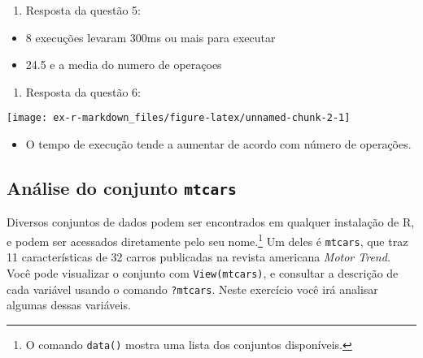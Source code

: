 \documentclass[
]{article}
\newenvironment{Shaded}{\begin{snugshade}}{\end{snugshade}}
\newcommand{\FunctionTok}[1]{\textcolor[rgb]{0.00,0.00,0.00}{#1}}
\newcommand{\NormalTok}[1]{#1}
\newcommand{\SpecialCharTok}[1]{\textcolor[rgb]{0.00,0.00,0.00}{#1}}
\providecommand{\tightlist}{%
  \setlength{\itemsep}{0pt}\setlength{\parskip}{0pt}}
\begin{document}
\begin{enumerate}
\def\labelenumi{\arabic{enumi}.}
\setcounter{enumi}{4}
\tightlist
\item
  Resposta da questão 5:
\end{enumerate}

\begin{itemize}
\tightlist
\item
  8 execuções levaram 300ms ou mais para executar
\item
  24.5 e a media do numero de operaçoes
\end{itemize}

\begin{enumerate}
\def\labelenumi{\arabic{enumi}.}
\setcounter{enumi}{5}
\tightlist
\item
  Resposta da questão 6:
\end{enumerate}

\begin{Shaded}
\end{Shaded}

\begin{center}\texttt{[image: ex-r-markdown\_files/figure-latex/unnamed-chunk-2-1]} \end{center}

\begin{itemize}
\tightlist
\item
  O tempo de execução tende a aumentar de acordo com número de
  operações.
\end{itemize}

\hypertarget{anuxe1lise-do-conjunto-mtcars}{%
\subsection{\texorpdfstring{Análise do conjunto
\texttt{mtcars}}{Análise do conjunto mtcars}}\label{anuxe1lise-do-conjunto-mtcars}}

Diversos conjuntos de dados podem ser encontrados em qualquer instalação
de R, e podem ser acessados diretamente pelo seu nome.\footnote{O
  comando \texttt{data()} mostra uma lista dos conjuntos disponíveis.}
Um deles é \texttt{mtcars}, que traz 11 características de 32 carros
publicadas na revista americana \emph{Motor Trend}. Você pode visualizar
o conjunto com \texttt{View(mtcars)}, e consultar a descrição de cada
variável usando o comando \texttt{?mtcars}. Neste exercício você irá
analisar algumas dessas variáveis.
\end{document}
